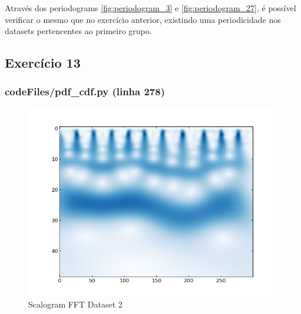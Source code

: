 \documentclass[pdftex,12pt,a4paper]{report}
\begin{document}
Através dos periodograms \ref{fig:periodogram_3} e \ref{fig:periodogram_27}, é possível verificar o mesmo que no exercício anterior, existindo uma periodicidade nos datasets pertencentes ao primeiro grupo.
\newpage
\subsection{Exercício 13}
\subsubsection{codeFiles/pdf\_cdf.py (linha 278)}

\begin{figure}[!htb]
  \centering
  \begin{minipage}[b]{0.4\textwidth}
    \includegraphics[width=\textwidth]{scalogram/scalogramfft2.png}
    \caption{Scalogram FFT Dataset 2}
    \label{fig:scalogramfft2}
  \end{minipage}
  \hfill
  \begin{minipage}[b]{0.4\textwidth}

\end{minipage}
\end{figure}
\end{document}
